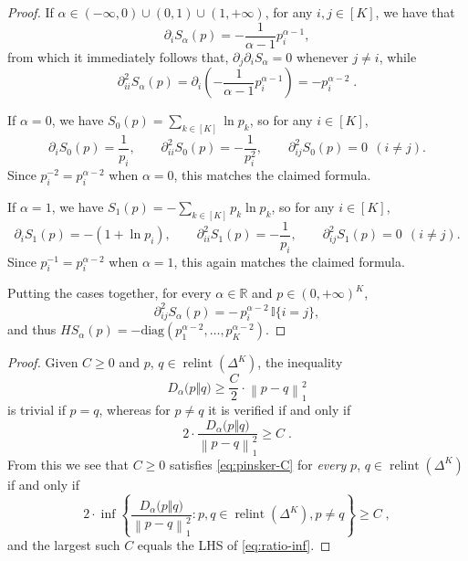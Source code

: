\documentclass[11pt,oneside,a4paper]{article}
\newcommand{\I}{\mathbb{I}}
\newcommand{\R}{\mathbb{R}}
\newcommand{\lrb}[1]{\left(#1\right)}
\newcommand{\brb}[1]{\bigl(#1\bigr)}
\newcommand{\lcb}[1]{\left\{#1\right\}}
\newcommand{\lno}[1]{\left\lVert#1\right\rVert}
\theoremstyle{plain}
\theoremstyle{definition}
\theoremstyle{remark}
\newcommand{\simplex}[1]{\Delta^{#1}}
\DeclareMathOperator*{\relint}{relint}
\begin{document}
{\renewcommand{\proofname}{Proof of Remark \ref{remark:hessian}}
\begin{proof}
If $\alpha \in (-\infty,0) \cup (0,1) \cup (1,+\infty)$, for any $i,j \in [K]$, we have that
\[
    \partial_i S_\alpha(p)=-\frac{1}{\alpha-1}p_i^{\alpha-1},
\]
from which it immediately follows that, $\partial_j\partial_i S_\alpha = 0$ whenever $j \neq i$, while
\[
    \partial_{ii}^2 S_\alpha(p)
=
    \partial_i \lrb{-\frac{1}{\alpha-1}p_i^{\alpha-1}}
=
    -p_i^{\alpha-2}\;.
\]

If $\alpha = 0$, we have $S_0(p)=\sum_{k\in[K]}\ln p_k$, so for any $i\in[K]$,
\[
\partial_i S_0(p)=\frac{1}{p_i},\qquad
\partial^2_{ii}S_0(p)=-\frac{1}{p_i^2},\qquad
\partial^2_{ij}S_0(p)=0\ \ (i\neq j).
\]
Since $p_i^{-2}=p_i^{\alpha-2}$ when $\alpha=0$, this matches the claimed formula.

If $\alpha =1$, we have $S_1(p)=-\sum_{k\in[K]}p_k\ln p_k$, so for any $i\in[K]$,
\[
\partial_i S_1(p)=-(1+\ln p_i),\qquad
\partial^2_{ii}S_1(p)=-\frac{1}{p_i},\qquad
\partial^2_{ij}S_1(p)=0\ \ (i\neq j).
\]
Since $p_i^{-1}=p_i^{\alpha-2}$ when $\alpha=1$, this again matches the claimed formula.

Putting the cases together, for every $\alpha \in \R$ and $p\in(0,+\infty)^K$,
\[
\partial^2_{ij} S_\alpha(p)= -\,p_i^{\alpha-2}\,\I\{i=j\},
\]
and thus $H S_\alpha(p)=-\mathrm{diag}(p_1^{\alpha-2},\dots,p_K^{\alpha-2})$.
\end{proof}
}
{\renewcommand{\proofname}{Proof of Remark \ref{remark:const-is-best}}
\begin{proof}
Given $C \geq 0$ and $p$, $q \in  \relint\lrb{\simplex{K}}$, the inequality
\begin{equation}\label{eq:pinsker-C}
    D_\alpha\brb{p\Vert q}
\ge
    \frac{C}{2} \cdot \lno{p - q}_1^2    
\end{equation}
is trivial if $p = q$, whereas for $p \neq q$ it is verified if and only if
\[
    2 \cdot\frac{D_\alpha\brb{p\Vert q}}{\lno{p - q}_1^2}
\ge
    C\;.
\]
From this we see that $C \geq 0$ satisfies \eqref{eq:pinsker-C} for \emph{every} $p$, $q \in  \relint\lrb{\simplex{K}}$ if and only if 
\begin{equation}\label{eq:ratio-inf}    
    2 \cdot \inf \lcb{\frac{D_\alpha\brb{p\Vert q}}{\lno{p - q}_1^2} : p , q \in  \relint\lrb{\simplex{K}}, p \neq q}
\ge
    C\;,
\end{equation}
and the largest such $C$ equals the LHS of \eqref{eq:ratio-inf}.
\end{proof}
}
\end{document}
